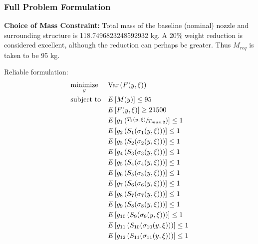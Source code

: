 \documentclass{article}
\begin{document}
\subsubsection{Full Problem Formulation}

\begin{mdframed}
\textbf{Choice of Mass Constraint:}  
Total mass of the baseline (nominal) nozzle and surrounding structure is 118.7496823248592932 kg. A 20\% weight reduction is considered excellent, although the reduction can perhaps be greater. Thus $M_{req}$ is taken to be 95 kg.
\end{mdframed}

\begin{multicols}{2}
\centering
Reliable formulation:
\begin{equation}
\label{eq:specific_robust_optim}
\begin{aligned}
& \underset{y}{\text{minimize}}
& & \textrm{Var} \left( F(y,\xi) \right) \\
& \text{subject to}
& & E \left[ M(y) \right] \leq 95 \\
& & & E \left[ F(y,\xi) \right] \geq 21500 \\
& & & E \left[ g_1 \left( \sfrac{T_2(y,\xi)}{T_{max,2}} \right) \right] \leq 1 \\
& & & E \left[ g_2 \left( S_1 ( \sigma_1(y,\xi) ) \right) \right] \leq 1 \\
& & & E \left[ g_3 \left( S_2 ( \sigma_2(y,\xi) ) \right) \right] \leq 1 \\
& & & E \left[ g_4 \left( S_3 ( \sigma_3(y,\xi) ) \right) \right] \leq 1 \\
& & & E \left[ g_5 \left( S_4 ( \sigma_4(y,\xi) ) \right) \right] \leq 1 \\
& & & E \left[ g_6 \left( S_5 ( \sigma_5(y,\xi) ) \right) \right] \leq 1 \\
& & & E \left[ g_7 \left( S_6 ( \sigma_6(y,\xi) ) \right) \right] \leq 1 \\
& & & E \left[ g_8 \left( S_7 ( \sigma_7(y,\xi) ) \right) \right] \leq 1 \\
& & & E \left[ g_9 \left( S_8 ( \sigma_8(y,\xi) ) \right) \right] \leq 1 \\
& & & E \left[ g_{10} \left( S_9 ( \sigma_9(y,\xi) ) \right) \right] \leq 1 \\
& & & E \left[ g_{11} \left( S_{10} ( \sigma_{10}(y,\xi) ) \right) \right] \leq 1 \\
& & & E \left[ g_{12} \left( S_{11} ( \sigma_{11}(y,\xi)  ) \right) \right] \leq 1 \\

\end{aligned}
\end{equation}
\end{multicols}
\end{document}
